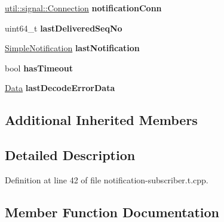 \begin{DoxyCompactItemize}
\item 
\hyperlink{classndn_1_1util_1_1signal_1_1Connection}{util\+::signal\+::\+Connection} {\bfseries notification\+Conn}\hypertarget{classndn_1_1util_1_1tests_1_1EndToEndFixture_abb0cb1217198a010f942774df059b31b}{}\label{classndn_1_1util_1_1tests_1_1EndToEndFixture_abb0cb1217198a010f942774df059b31b}

\item 
uint64\+\_\+t {\bfseries last\+Delivered\+Seq\+No}\hypertarget{classndn_1_1util_1_1tests_1_1EndToEndFixture_a5d9461cf5fa9417092dd5632a45b7113}{}\label{classndn_1_1util_1_1tests_1_1EndToEndFixture_a5d9461cf5fa9417092dd5632a45b7113}

\item 
\hyperlink{classndn_1_1util_1_1tests_1_1SimpleNotification}{Simple\+Notification} {\bfseries last\+Notification}\hypertarget{classndn_1_1util_1_1tests_1_1EndToEndFixture_a74b6f78da447c9bb0c43d43f38deda0f}{}\label{classndn_1_1util_1_1tests_1_1EndToEndFixture_a74b6f78da447c9bb0c43d43f38deda0f}

\item 
bool {\bfseries has\+Timeout}\hypertarget{classndn_1_1util_1_1tests_1_1EndToEndFixture_a27c7f3831f4b26ea89975fc802373379}{}\label{classndn_1_1util_1_1tests_1_1EndToEndFixture_a27c7f3831f4b26ea89975fc802373379}

\item 
\hyperlink{classndn_1_1Data}{Data} {\bfseries last\+Decode\+Error\+Data}\hypertarget{classndn_1_1util_1_1tests_1_1EndToEndFixture_a41bdd449881483e89d8345841656ca0b}{}\label{classndn_1_1util_1_1tests_1_1EndToEndFixture_a41bdd449881483e89d8345841656ca0b}

\end{DoxyCompactItemize}
\subsection*{Additional Inherited Members}


\subsection{Detailed Description}


Definition at line 42 of file notification-\/subscriber.\+t.\+cpp.



\subsection{Member Function Documentation}
